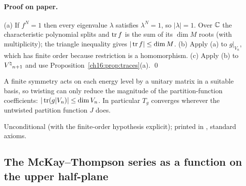 \paragraph{Proof on paper.}  (a) If $f^N=1$ then every eigenvalue $\lambda$ satisfies $\lambda^N=1$, so $|\lambda|=1$.
Over ${\mathbb{C}}$ the characteristic polynomial splits and $\operatorname{tr} f$ is the sum of its $\dim M$ roots (with multiplicity); the
triangle inequality gives $|\operatorname{tr} f|\le\dim M$.  (b) Apply (a) to $g|_{V_n}$, which has finite order because
restriction is a homomorphism.  (c) Apply (b) to ${V^{\natural}}_{n+1}$ and use Proposition~\ref{ch16:prop:traces}(a). \qed
\begin{physics}
A finite symmetry acts on each energy level by a unitary matrix in a suitable basis, so twisting can only reduce the
magnitude of the partition-function coefficients: $|\operatorname{tr}(g|V_n)|\le\dim V_n$.  In particular $T_g$ converges wherever
the untwisted partition function $J$ does.
\end{physics}
\begin{status}
Unconditional (with the finite-order hypothesis explicit); printed in ,
standard axioms.
\end{status}

\subsection{The McKay--Thompson series as a function on the upper half-plane}

